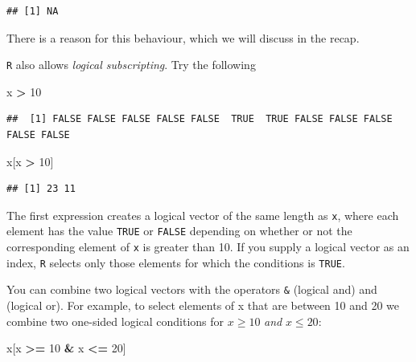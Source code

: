 \documentclass[
]{book}
\newenvironment{Shaded}{\begin{snugshade}}{\end{snugshade}}
\newcommand{\DecValTok}[1]{\textcolor[rgb]{0.00,0.00,0.81}{#1}}
\newcommand{\NormalTok}[1]{#1}
\newcommand{\SpecialCharTok}[1]{\textcolor[rgb]{0.81,0.36,0.00}{\textbf{#1}}}
\begin{document}
\begin{verbatim}
## [1] NA
\end{verbatim}

There is a reason for this behaviour, which we will discuss in the recap.

\texttt{R} also allows \emph{logical subscripting}. Try the following

\begin{Shaded}
\begin{Highlighting}[]
\NormalTok{x }\SpecialCharTok{\textgreater{}} \DecValTok{10}
\end{Highlighting}
\end{Shaded}

\begin{verbatim}
##  [1] FALSE FALSE FALSE FALSE FALSE  TRUE  TRUE FALSE FALSE FALSE FALSE FALSE
\end{verbatim}

\begin{Shaded}
\begin{Highlighting}[]
\NormalTok{x[x }\SpecialCharTok{\textgreater{}} \DecValTok{10}\NormalTok{]}
\end{Highlighting}
\end{Shaded}

\begin{verbatim}
## [1] 23 11
\end{verbatim}

The first expression creates a logical vector of the same length as
\texttt{x}, where each element has the value \texttt{TRUE} or
\texttt{FALSE} depending on whether or not the corresponding element
of \texttt{x} is greater than 10. If you supply a logical vector as an
index, \texttt{R} selects only those elements for which the conditions is
\texttt{TRUE}.

You can combine two logical vectors with the operators \texttt{\&}
(logical and) and \texttt{\textbar{}} (logical or). For example, to select
elements of x that are between 10 and 20 we combine two one-sided logical
conditions for \(x \geq 10\) \emph{and} \(x \leq 20\):

\begin{Shaded}
\begin{Highlighting}[]
\NormalTok{x[x }\SpecialCharTok{\textgreater{}=} \DecValTok{10} \SpecialCharTok{\&}\NormalTok{ x }\SpecialCharTok{\textless{}=} \DecValTok{20}\NormalTok{]}
\end{Highlighting}
\end{Shaded}
\end{document}
